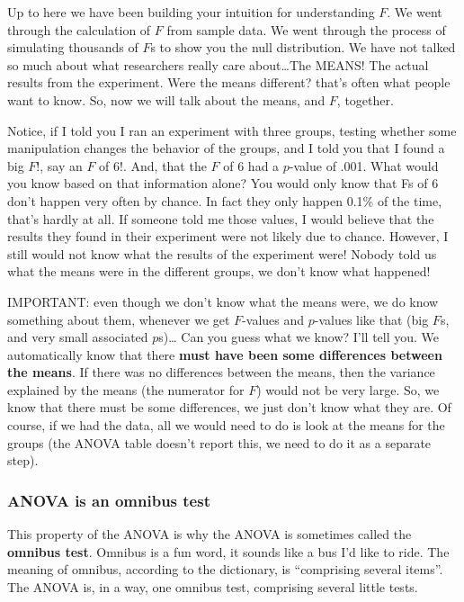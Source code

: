 \documentclass[]{book}
\begin{document}
Up to here we have been building your intuition for understanding \(F\). We went through the calculation of \(F\) from sample data. We went through the process of simulating thousands of \(F\)s to show you the null distribution. We have not talked so much about what researchers really care about\ldots{}The MEANS! The actual results from the experiment. Were the means different? that's often what people want to know. So, now we will talk about the means, and \(F\), together.

Notice, if I told you I ran an experiment with three groups, testing whether some manipulation changes the behavior of the groups, and I told you that I found a big \(F\)!, say an \(F\) of 6!. And, that the \(F\) of 6 had a \(p\)-value of .001. What would you know based on that information alone? You would only know that Fs of 6 don't happen very often by chance. In fact they only happen 0.1\% of the time, that's hardly at all. If someone told me those values, I would believe that the results they found in their experiment were not likely due to chance. However, I still would not know what the results of the experiment were! Nobody told us what the means were in the different groups, we don't know what happened!

IMPORTANT: even though we don't know what the means were, we do know something about them, whenever we get \(F\)-values and \(p\)-values like that (big \(F\)s, and very small associated \(p\)s)\ldots{} Can you guess what we know? I'll tell you. We automatically know that there \textbf{must have been some differences between the means}. If there was no differences between the means, then the variance explained by the means (the numerator for \(F\)) would not be very large. So, we know that there must be some differences, we just don't know what they are. Of course, if we had the data, all we would need to do is look at the means for the groups (the ANOVA table doesn't report this, we need to do it as a separate step).

\hypertarget{anova-is-an-omnibus-test}{%
\subsubsection{ANOVA is an omnibus test}\label{anova-is-an-omnibus-test}}

This property of the ANOVA is why the ANOVA is sometimes called the \textbf{omnibus test}. Omnibus is a fun word, it sounds like a bus I'd like to ride. The meaning of omnibus, according to the dictionary, is ``comprising several items''. The ANOVA is, in a way, one omnibus test, comprising several little tests.
\end{document}
